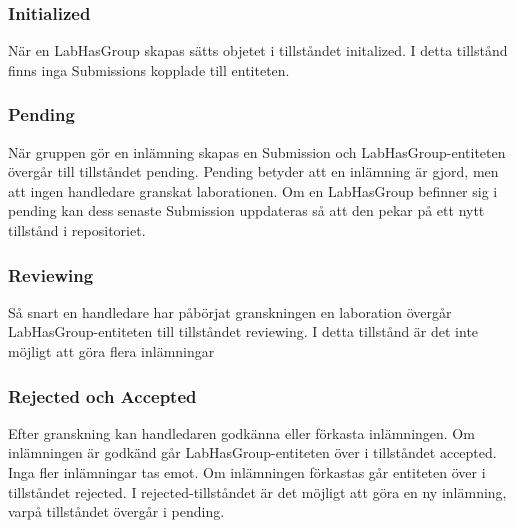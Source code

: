 \subsubsection{Initialized}

När en LabHasGroup skapas sätts objetet i tillståndet initalized. I detta tillstånd finns inga Submissions kopplade till entiteten.

\subsubsection{Pending}

När gruppen gör en inlämning skapas en Submission och LabHasGroup-entiteten övergår till tillståndet pending. Pending betyder att en inlämning är gjord, men att ingen handledare granskat laborationen.
Om en LabHasGroup befinner sig i pending kan dess senaste Submission uppdateras så att den pekar på ett nytt tillstånd i repositoriet.

\subsubsection{Reviewing}

Så snart en handledare har påbörjat granskningen en laboration övergår LabHasGroup-entiteten till tillståndet reviewing. I detta tillstånd är det inte möjligt att göra flera inlämningar

\subsubsection{Rejected och Accepted}

Efter granskning kan handledaren godkänna eller förkasta inlämningen. Om inlämningen är godkänd går LabHasGroup-entiteten över i tillståndet accepted. Inga fler inlämningar tas emot. Om inlämningen förkastas går entiteten över i tillståndet rejected. I rejected-tillståndet är det möjligt att göra en ny inlämning, varpå tillståndet övergår i pending.
